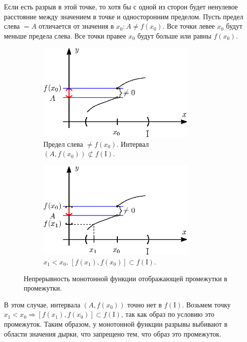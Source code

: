\documentclass[12pt]{article}
\newcommand{\MI}{\mathrm{I}}
\theoremstyle{definition}
\begin{document}
 Если есть разрыв в этой точке, то хотя бы с одной из сторон будет ненулевое расстояние между значением в точке и односторонним пределом. Пусть предел слева $=A$ отличается от значения в $x_0 \colon A \neq f(x_0)$. Все точки левее $x_0$ будут меньше предела слева. Все точки правее $x_0$ будут больше или равны $f(x_0)$.

\begin{figure}[H]
	\begin{subfigure}[b]{0.5\textwidth}
		\centering
		\includegraphics[width=0.85\textwidth]{19_2.eps}
		\caption{Предел слева $\neq f(x_0)$. Интервал $(A,f(x_0)) \not\subset f(\MI)$.}
		\label{19_2}
	\end{subfigure}%
	\begin{subfigure}[b]{0.5\textwidth}
		\centering
		\includegraphics[width=0.85\textwidth]{19_3.eps}
		\caption{$x_1 < x_0,\,[f(x_1),f(x_0)] \subset f(\MI)$.}
		\label{19_3}
	\end{subfigure}
	\caption{Непрерывность монотонной функции отображающей промежутки в промежутки.}
\end{figure}

В этом случае, интервала $(A,f(x_0))$ точно нет в $f(\MI)$. Возьмем точку $x_1 < x_0 \Rightarrow [f(x_1),f(x_0)] \subset f(\MI)$, так как образ по условию это промежуток. Таким образом, у монотонной функции разрывы выбивают в области значения дырки, что запрещено тем, что образ это промежуток.
 
\end{document}
